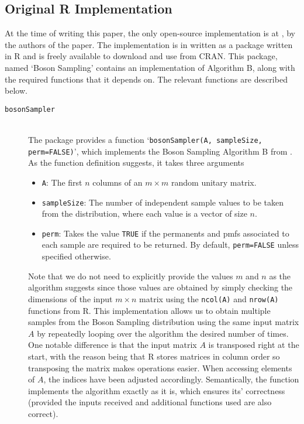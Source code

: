 \documentclass[11pt]{article}
\theoremstyle{theorem}
\theoremstyle{theorem}
\theoremstyle{remark}
\theoremstyle{note}
\theoremstyle{plain}
\theoremstyle{definition}
\begin{document}
\subsection{Original R Implementation} \label{sec:r_code}
At the time of writing this paper, the only open-source implementation is at \cite{clifford_r2017}, by the authors of the paper. The implementation is in written as a package written in R and is freely available to download and use from CRAN. This package, named `Boson Sampling' contains an implementation of Algorithm B, along with the required functions that it depends on. The relevant functions are described below.
\begin{description}
\item[\texttt{bosonSampler}] \hfill \\ The package provides a function `\texttt{bosonSampler(A, sampleSize, perm=FALSE)}', which implements the Boson Sampling Algorithm B from \cite{clifford17}. As the function definition suggests, it takes three arguments
\begin{itemize}
\item \texttt{A}: The first $n$ columns of an $m \times m$ random unitary matrix.
\item \texttt{sampleSize}: The number of independent sample values to be taken from the distribution, where each value is a vector of size $n$.
\item \texttt{perm}: Takes the value \texttt{TRUE} if the permanents and pmfs associated to each sample are required to be returned. By default, \texttt{perm=FALSE} unless specified otherwise.
\end{itemize}
Note that we do not need to explicitly provide the values $m$ and $n$ as the algorithm suggests since those values are obtained by simply checking the dimensions of the input $m \times n$ matrix using the \texttt{ncol(A)} and \texttt{nrow(A)} functions from R. This implementation allows us to obtain multiple samples from the Boson Sampling distribution using the same input matrix $A$ by repeatedly looping over the algorithm the desired number of times. One notable difference is that the input matrix $A$ is transposed right at the start, with the reason being that R stores matrices in column order so transposing the matrix makes operations easier. When accessing elements of $A$, the indices have been adjusted accordingly. Semantically, the function implements the algorithm exactly as it is, which ensures its' correctness (provided the inputs received and additional functions used are also correct).

\end{description}
\end{document}
